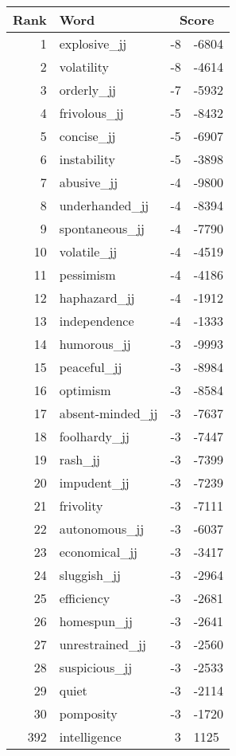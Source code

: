 \begin{longtable}[!htbp]{| rlr@{.}l |}
    \hline
    \textbf{Rank} & \textbf{Word} & \multicolumn{2}{c|}{\textbf{Score}} \\
    \hline
    \endhead
    1 & explosive\_jj & -8 & -6804 \\
    2 & volatility & -8 & -4614 \\
    3 & orderly\_jj & -7 & -5932 \\
    4 & frivolous\_jj & -5 & -8432 \\
    5 & concise\_jj & -5 & -6907 \\
    6 & instability & -5 & -3898 \\
    7 & abusive\_jj & -4 & -9800 \\
    8 & underhanded\_jj & -4 & -8394 \\
    9 & spontaneous\_jj & -4 & -7790 \\
    10 & volatile\_jj & -4 & -4519 \\
    11 & pessimism & -4 & -4186 \\
    12 & haphazard\_jj & -4 & -1912 \\
    13 & independence & -4 & -1333 \\
    14 & humorous\_jj & -3 & -9993 \\
    15 & peaceful\_jj & -3 & -8984 \\
    16 & optimism & -3 & -8584 \\
    17 & absent-minded\_jj & -3 & -7637 \\
    18 & foolhardy\_jj & -3 & -7447 \\
    19 & rash\_jj & -3 & -7399 \\
    20 & impudent\_jj & -3 & -7239 \\
    21 & frivolity & -3 & -7111 \\
    22 & autonomous\_jj & -3 & -6037 \\
    23 & economical\_jj & -3 & -3417 \\
    24 & sluggish\_jj & -3 & -2964 \\
    25 & efficiency & -3 & -2681 \\
    26 & homespun\_jj & -3 & -2641 \\
    27 & unrestrained\_jj & -3 & -2560 \\
    28 & suspicious\_jj & -3 & -2533 \\
    29 & quiet & -3 & -2114 \\
    30 & pomposity & -3 & -1720 \\
    392 & intelligence & 3 & 1125 \\

\end{longtable}
